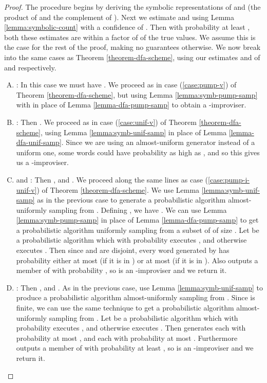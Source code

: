 \documentclass[a4paper,USenglish,numberwithinsect]{lipics}
\theoremstyle{plain}
\theoremstyle{definition}
\begin{document}
\theoremSymbolicScheme*
\begin{proof}
The procedure begins by deriving the symbolic representations of  and  (the product of  and the complement of ). Next we estimate  and  using Lemma \ref{lemma:symbolic-count} with a confidence of . Then with probability at least , both these estimates are within a factor of  of the true values. We assume this is the case for the rest of the proof, making no guarantees otherwise. We now break into the same cases as Theorem \ref{theorem-dfa-scheme}, using our estimates  and  of  and  respectively.

\begin{enumerate}[(A)]
\item : In this case we must have . We proceed as in case (\ref{case:pump-v}) of Theorem \ref{theorem-dfa-scheme}, but using Lemma \ref{lemma:symb-pump-samp} with  in place of Lemma \ref{lemma-dfa-pump-samp} to obtain a -improviser.

\item : Then . We proceed as in case (\ref{case:unif-v}) of Theorem \ref{theorem-dfa-scheme}, using Lemma \ref{lemma:symb-unif-samp} in place of Lemma \ref{lemma-dfa-unif-samp}. Since we are using an almost-uniform generator instead of a uniform one, some words could have probability as high as , and so this gives us a -improviser.

\item  and : Then , and . We proceed along the same lines as case (\ref{case:pump-i-unif-v}) of Theorem \ref{theorem-dfa-scheme}. We use Lemma \ref{lemma:symb-unif-samp} as in the previous case to generate a probabilistic algorithm  almost-uniformly sampling from . Defining , we have . We can use Lemma \ref{lemma:symb-pump-samp} in place of Lemma \ref{lemma-dfa-pump-samp} to get a probabilistic algorithm  uniformly sampling from a subset of  of size . Let  be a probabilistic algorithm which with probability  executes , and otherwise executes . Then since  and  are disjoint, every word generated by  has probability either at most  (if it is in ) or at most  (if it is in ). Also  outputs a member of  with probability , so  is an -improviser and we return it.

\item : Then , and . As in the previous case, use Lemma \ref{lemma:symb-unif-samp} to produce a probabilistic algorithm  almost-uniformly sampling from . Since  is finite, we can use the same technique to get a probabilistic algorithm  almost-uniformly sampling from . Let  be a probabilistic algorithm which with probability  executes , and otherwise executes . Then  generates each  with probability at most , and each  with probability at most . Furthermore  outputs a member of  with probability at least , so  is an -improviser and we return it.


\end{enumerate}
\end{proof}
\end{document}
